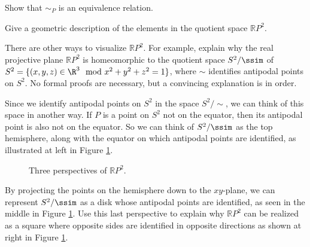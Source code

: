 \ba

\item Show that $\sim_P$ is an equivalence relation.

\item Give a geometric description of the elements in the quotient space $\mathbb{R}P^2$.  

\item There are other ways to visualize $\mathbb{R}P^2$. For example, explain why the real projective plane $\mathbb{R}P^2$ is homeomorphic to the quotient space $S^2/\ssim$ of $S^2 = \{(x,y,z) \in \R^3 \mod x^2+y^2+z^2 = 1\}$, where $\sim$ identifies antipodal points on $S^2$. No formal proofs are necessary, but a convincing explanation is in order.

\item Since we identify antipodal points on $S^2$ in the space $S^2/\sim$, we can think of this space in another way. If $P$ is a point on $S^2$ not on the equator, then its antipodal point is also not on the equator. So we can think of $S^2/\ssim$ as the top hemisphere, along with the equator on which antipodal points are identified, as illustrated at left in Figure \ref{F:projective_1}. 
\begin{center}
\begin{figure}[h]
\begin{center}
 \hspace{0.25in}  \hspace{0.25in} 
\caption{Three perspectives of $\mathbb{R}P^2$.} 
\label{F:projective_1}
\end{center}
\end{figure}
\end{center}
By projecting the points on the hemisphere down to the $xy$-plane, we can represent $S^2/\ssim$ as a disk whose antipodal points are identified, as seen in the middle in Figure \ref{F:projective_1}. Use this last perspective to explain why $\mathbb{R}P^2$ can be realized as a square where opposite sides are identified in opposite directions as shown at right in Figure \ref{F:projective_1}.

